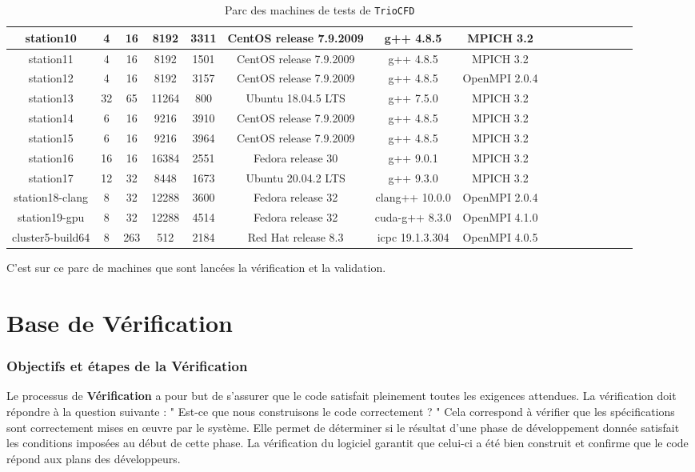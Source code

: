 \begin{table}[H]
\begin{centering}
\begin{tabular}{Sc Sc Sc Sc Sc Sc Sc Sc}
station10 & 4 & 16 & 8192 & 3311 & CentOS release 7.9.2009 & g++ 4.8.5 & MPICH 3.2 \tabularnewline \hline %
station11 & 4 & 16 & 8192 & 1501 & CentOS release 7.9.2009 & g++ 4.8.5 & MPICH 3.2 \tabularnewline \hline %
station12 & 4 & 16 & 8192 & 3157 & CentOS release 7.9.2009 & g++ 4.8.5 & OpenMPI 2.0.4 \tabularnewline \hline %
station13 & 32 & 65 & 11264 & 800 & Ubuntu 18.04.5 LTS & g++ 7.5.0 & MPICH 3.2 \tabularnewline \hline %
station14 & 6 & 16 & 9216 & 3910 & CentOS release 7.9.2009 & g++ 4.8.5 & MPICH 3.2 \tabularnewline \hline %
station15 & 6 & 16 & 9216 & 3964 & CentOS release 7.9.2009 & g++ 4.8.5 & MPICH 3.2 \tabularnewline \hline %
station16 & 16 & 16 & 16384 & 2551 & Fedora release 30 & g++ 9.0.1 & MPICH 3.2 \tabularnewline \hline %
station17 & 12 & 32 & 8448 & 1673 & Ubuntu 20.04.2 LTS & g++ 9.3.0 & MPICH 3.2 \tabularnewline \hline %
station18-clang & 8 & 32 & 12288 & 3600 & Fedora release 32 & clang++ 10.0.0 & OpenMPI 2.0.4 \tabularnewline \hline %
station19-gpu & 8 & 32 & 12288 & 4514 & Fedora release 32 & cuda-g++ 8.3.0 & OpenMPI 4.1.0 \tabularnewline \hline %
cluster5-build64 & 8 & 263 & 512 & 2184 & Red Hat release 8.3 & icpc 19.1.3.304 & OpenMPI 4.0.5 \tabularnewline
\hline\hline
\end{tabular}
\normalsize
\par\end{centering}
\caption{\label{tab:Computer-characteristics}Parc des machines de tests de \texttt{TrioCFD}}
\end{table}
C'est sur ce parc de machines que sont lanc\'ees la v\'erification et la validation.
\newpage


\chapter{\label{chapitre:verification}Base de V\'erification}

\subsection{Objectifs et \'etapes de la V\'erification}

Le processus de \textbf{V\'erification} a pour but de s'assurer que le code satisfait pleinement toutes les exigences attendues. La v\'erification doit r\'epondre \`a la question suivante : " Est-ce que nous construisons le code correctement ? " Cela correspond \`a v\'erifier que les sp\'ecifications sont correctement mises en \oe uvre par le syst\`eme. Elle permet de d\'eterminer si le r\'esultat d'une phase de d\'eveloppement donn\'ee satisfait les conditions impos\'ees au d\'ebut de cette phase. La v\'erification du logiciel garantit que celui-ci a \'et\'e bien construit et confirme que le code r\'epond aux plans des d\'eveloppeurs.\smallskip\newline



